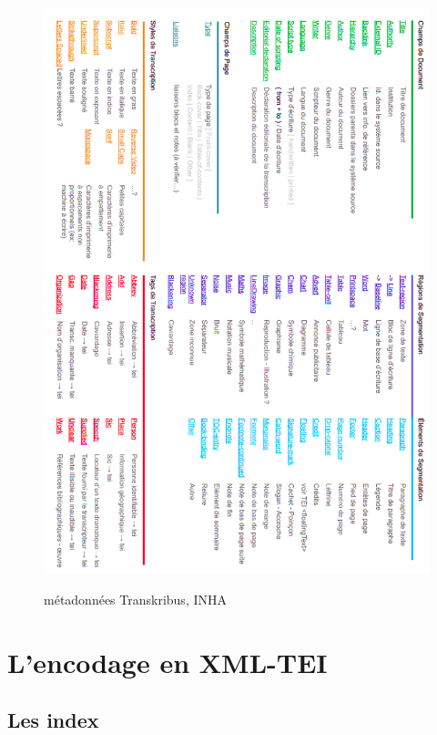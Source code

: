 \begin{figure}[ht]
    \centering
    \caption{ métadonnées Transkribus, INHA}
    \includegraphics[width=16cm]{images/schema_modele_transkribus_inha3.png}
    \label{schema_modele_transkribus_inha3}
\end{figure}

\chapter{L'encodage en XML-TEI}
\section{Les index}

